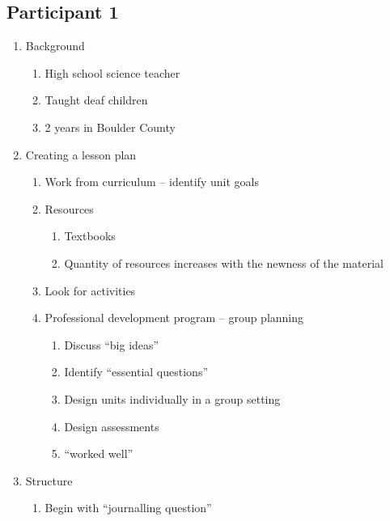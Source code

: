 \subsection{Participant 1}
\begin{enumerate}
	\item Background
		\begin{enumerate}
			\item High school science teacher

			\item Taught deaf children

			\item 2 years in Boulder County
		\end{enumerate}

	\item Creating a lesson plan
		\begin{enumerate}
			\item Work from curriculum -- identify unit goals

			\item Resources
				\begin{enumerate}
					\item Textbooks

					\item Quantity of resources increases with the newness of
						the material

				\end{enumerate}

			\item Look for activities

			\item Professional development program -- group planning
				\begin{enumerate}
					\item Discuss ``big ideas''

					\item Identify ``essential questions''

					\item Design units individually in a group setting

					\item Design assessments

					\item ``worked well''

				\end{enumerate}

		\end{enumerate}

	\item Structure
		\begin{enumerate}
			\item Begin with ``journalling question''


\end{enumerate}
\end{enumerate}
